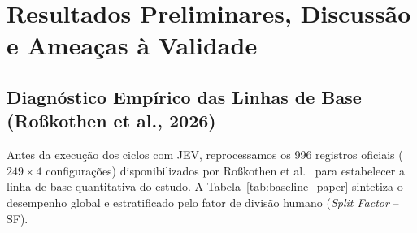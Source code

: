 \section{Resultados Preliminares, Discussão e Ameaças à Validade}

\subsection{Diagnóstico Empírico das Linhas de Base (Ro\ss kothen et al., 2026)}
Antes da execução dos ciclos com JEV, reprocessamos os 996 registros oficiais ($249 \times 4$ configurações) disponibilizados por Ro\ss kothen et al.~\cite{rosskothen2026zenodo} para estabelecer a linha de base quantitativa do estudo. A Tabela~\ref{tab:baseline_paper} sintetiza o desempenho global e estratificado pelo fator de divisão humano (\textit{Split Factor} -- SF).

\begin{table}[t]
\centering
\caption{Desempenho das Configurações de Referência de Ro\ss kothen et al.~\cite{rosskothen2026zenodo} sobre os 249 Requisitos Fonte}
\label{tab:baseline_paper}
\end{table}

